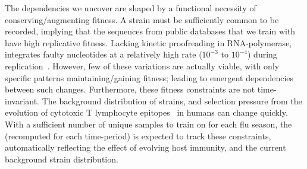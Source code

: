 \documentclass[onecolumn, compsoc,10pt]{IEEEtran}
\begin{document}
The  dependencies we uncover are shaped by  a  functional necessity of conserving/augmenting  fitness. A  strain must be sufficiently common  to be recorded, implying that the sequences from public databases that we train  with have  high replicative fitness. Lacking kinetic proofreading  in  RNA-polymerase,  \infl integrates  faulty nucleotides   at a relatively high rate ($10^{-3}$ to $10^{-4}$) during  replication~\cite{ahlquist2002rna,chen2006avian}. However, few   of these variations are actually viable, with only specific patterns  maintaining/gaining fitness;  leading to emergent dependencies between such changes. Furthermore, these fitness constraints are not time-invariant. The background distribution of strains, and selection pressure from the evolution of cytotoxic T lymphocyte  epitopes~\cite{woolthuis2016long,fan2012role,van2016differential,berkhoff2007assessment,van2012evasion} in humans can change quickly. With a sufficient number of unique samples to train on for each flu season, the \enet (recomputed for each time-period) is expected to  track these  constraints, automatically reflecting the effect of  evolving host immunity, and the current background strain distribution.  
\end{document}
